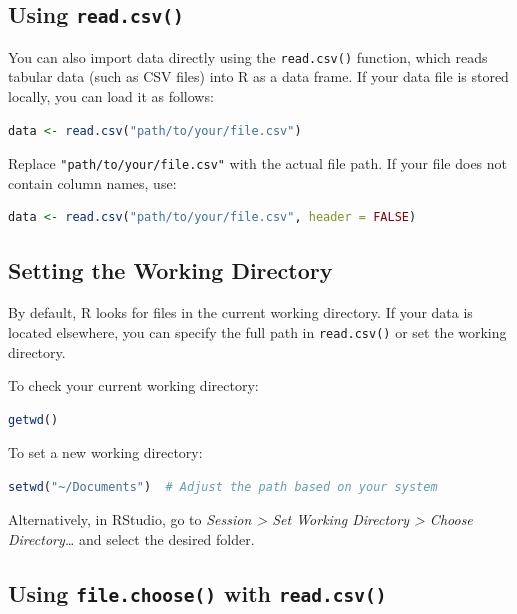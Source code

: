 \documentclass[
]{book}
\newcommand{\passthrough}[1]{#1}
\theoremstyle{definition}
\theoremstyle{definition}
\theoremstyle{definition}
\theoremstyle{definition}
\theoremstyle{remark}
\begin{document}
\subsection*{\texorpdfstring{Using \texttt{read.csv()}}{Using read.csv()}}\label{using-read.csv}

You can also import data directly using the \passthrough{\lstinline!read.csv()!} function, which reads tabular data (such as CSV files) into R as a data frame. If your data file is stored locally, you can load it as follows:

\begin{lstlisting}[language=R]
data <- read.csv("path/to/your/file.csv")
\end{lstlisting}

Replace \passthrough{\lstinline!"path/to/your/file.csv"!} with the actual file path. If your file does not contain column names, use:

\begin{lstlisting}[language=R]
data <- read.csv("path/to/your/file.csv", header = FALSE)
\end{lstlisting}

\subsection*{Setting the Working Directory}\label{setting-the-working-directory}

By default, R looks for files in the current working directory. If your data is located elsewhere, you can specify the full path in \passthrough{\lstinline!read.csv()!} or set the working directory.

To check your current working directory:

\begin{lstlisting}[language=R]
getwd()
\end{lstlisting}

To set a new working directory:

\begin{lstlisting}[language=R]
setwd("~/Documents")  # Adjust the path based on your system
\end{lstlisting}

Alternatively, in RStudio, go to \emph{Session \textgreater{} Set Working Directory \textgreater{} Choose Directory\ldots{}} and select the desired folder.

\subsection*{\texorpdfstring{Using \texttt{file.choose()} with \texttt{read.csv()}}{Using file.choose() with read.csv()}}\label{using-file.choose-with-read.csv}
\end{document}
